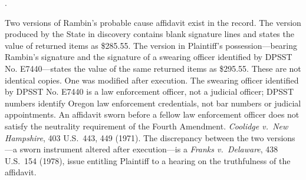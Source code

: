 \documentclass[12pt,letterpaper]{article}
\newcounter{complaintpara}
\newenvironment{paras}{%
	\begin{list}{\arabic{complaintpara}.}{%
			\setlength{\leftmargin}{0.5in}%
			\setlength{\labelwidth}{0.4in}%
			\setlength{\labelsep}{0.1in}%
			\setlength{\itemsep}{0pt}%
			\setlength{\parsep}{0pt}%
			\setlength{\topsep}{6pt}%
		}%
	}{%
	\end{list}%
}
\begin{document}
\begin{paras}
		\item\label{fact:affidavit-versions} Two versions of Rambin's probable cause affidavit exist in the record. The version produced by the State in discovery contains blank signature lines and states the value of returned items as \$285.55. The version in Plaintiff's possession---bearing Rambin's signature and the signature of a swearing officer identified by DPSST No. E7440---states the value of the same returned items as \$295.55. These are not identical copies. One was modified after execution. The swearing officer identified by DPSST No. E7440 is a law enforcement officer, not a judicial officer; DPSST numbers identify Oregon law enforcement credentials, not bar numbers or judicial appointments. An affidavit sworn before a fellow law enforcement officer does not satisfy the neutrality requirement of the Fourth Amendment. \textit{Coolidge v.\ New Hampshire}, 403 U.S.\ 443, 449 (1971). The discrepancy between the two versions---a sworn instrument altered after execution---is a \textit{Franks v.\ Delaware}, 438 U.S.\ 154 (1978), issue entitling Plaintiff to a hearing on the truthfulness of the affidavit.
		

\end{paras}
\end{document}
